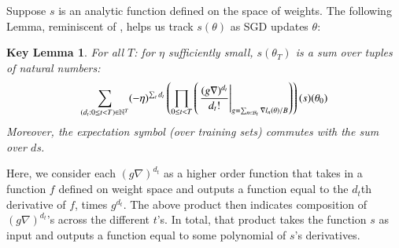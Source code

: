 \documentclass[openany, notitlepage, justified]{tufte-book}
\theoremstyle{plain}
\newtheorem*{klem*}{Key Lemma}
\theoremstyle{definition}
\newcommand{\wrap}[1]{\left(#1\right)}
\newcommand{\Bb}{\mathcal{B}}
\begin{document}
        Suppose $s$ is an analytic function defined on the space of weights.
        The following Lemma, reminiscent of \citep{dy49a}, helps us track
        $s(\theta)$ as SGD updates $\theta$:
        \begin{klem*} \label{lem:dyson}
            For all $T$: for $\eta$ sufficiently small, $s(\theta_T)$ is a sum
            over tuples of natural numbers:
            \begin{equation}\label{eq:dyson}
                \sum_{(d_t: 0\leq t<T) \in \NN^T}
                (-\eta)^{\sum_t d_t}
                \wrap{
                    \prod_{0 \leq t < T}
                        \wrap{\left.
                            \frac{(g \nabla)^{d_t}}{d_t!}
                        \right|_{g = \sum_{n\in \Bb_t} \nabla l_n(\theta) / B}}
                }(s) (\theta_0)
            \end{equation}
            Moreover, the expectation symbol (over training sets) commutes with
            the sum over $d$s.
        \end{klem*}
        Here, we consider each $(g \nabla)^{d_t}$ as a higher order function
        that takes in a function $f$ defined on weight space and outputs a
        function equal to the $d_t$th derivative of $f$, times $g^{d_t}$.
        The above product then indicates composition of $(g \nabla)^{d_t}$'s
        across the different $t$'s.  In total, that product takes the function
        $s$ as input and outputs a function equal to some polynomial of $s$'s
        derivatives.
\end{document}

